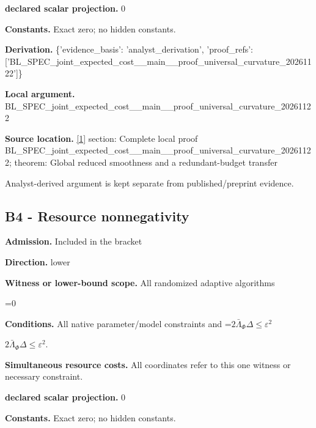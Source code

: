\documentclass[10pt,a4paper]{article}
\newcommand{\AtlasMath}[1]{\par\begingroup\centering\setbox0=\hbox{$\displaystyle #1$}\ifdim\wd0>1.4\linewidth\typeout{ATLAS WIDE FORMULA: \the\wd0}\fi\ifdim\wd0>\linewidth\resizebox{\linewidth}{!}{\box0}\else\box0\fi\par\endgroup}
\newcommand{\AtlasInlineMath}[1]{\begingroup\setbox0=\hbox{$#1$}\ifdim\wd0>.4\linewidth\endgroup\AtlasMath{#1}\else\endgroup$#1$\fi}
\begin{document}
\textbf{declared scalar projection.} 0



\textbf{Constants.} Exact zero; no hidden constants.



\textbf{Derivation.} \{'evidence\_basis': 'analyst\_derivation', 'proof\_refs': ['BL\_SPEC\_joint\_expected\_c\allowbreak{}ost\_\_main\_\_proof\_univers\allowbreak{}al\_curvature\_20261122']\}



\textbf{Local argument.} BL\_SPEC\_joint\_expected\_c\allowbreak{}ost\_\_main\_\_proof\_univers\allowbreak{}al\_curvature\_20261122



\textbf{Source location.} \href{https://arxiv.org/pdf/2610.03633v2}{[1]} section: Complete local proof BL\_SPEC\_joint\_expected\_c\allowbreak{}ost\_\_main\_\_proof\_univers\allowbreak{}al\_curvature\_20261122; theorem: Global reduced smoothness and a redundant-budget transfer



Analyst-derived argument is kept separate from published/preprint evidence.



\subsection{B4 - Resource nonnegativity}


\textbf{Admission.} Included in the bracket



\textbf{Direction.} lower



\textbf{Witness or lower-bound scope.} All randomized adaptive algorithms



\AtlasMath{0}


\textbf{Conditions.} All native parameter/model constraints and \AtlasInlineMath{2\bar\Lambda_\Phi\Delta\le\varepsilon^2}.



\textbf{Simultaneous resource costs.} All coordinates refer to this one witness or necessary constraint.



\textbf{declared scalar projection.} 0



\textbf{Constants.} Exact zero; no hidden constants.
\end{document}
